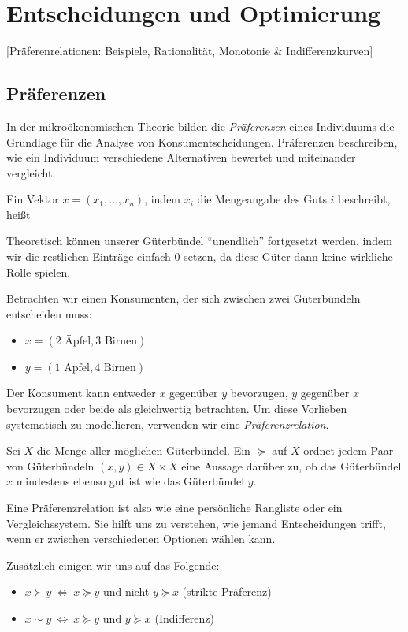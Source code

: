 \chapter{Entscheidungen und Optimierung}

[Präferenrelationen: Beispiele, Rationalität, Monotonie \& Indifferenzkurven]
\section{Präferenzen}
In der mikroökonomischen Theorie bilden die \emph{Präferenzen} eines Individuums die Grundlage für die Analyse von Konsumentscheidungen.
Präferenzen beschreiben, wie ein Individuum verschiedene Alternativen bewertet und miteinander vergleicht.

\begin{definition}[Güterbündel] 
	Ein Vektor $x = (x_1,\dotsc,x_n)$, indem $x_i$ die Mengeangabe des Guts $i$ beschreibt, heißt 
\end{definition}
\begin{remark}
	Theoretisch können unserer Güterbündel \enquote{unendlich} fortgesetzt werden, indem wir die restlichen Einträge einfach $0$ setzen, da diese Güter dann keine wirkliche Rolle spielen.
\end{remark}
\begin{example}
	Betrachten wir einen Konsumenten, der sich zwischen zwei Güterbündeln entscheiden muss:
	\begin{itemize}
		\item $x = (2 \text{ Äpfel}, 3 \text{ Birnen})$
		\item $y = (1 \text{ Apfel}, 4 \text{ Birnen})$
	\end{itemize}
	Der Konsument kann entweder $x$ gegenüber $y$ bevorzugen, $y$ gegenüber $x$ bevorzugen oder beide als gleichwertig betrachten. Um diese Vorlieben systematisch zu modellieren, verwenden wir eine \textit{Präferenzrelation}.
\end{example}

\begin{definition}[Präferenzrelation]
	Sei $X$ die Menge aller möglichen Güterbündel.
	Ein  $\succeq$  auf $X$ ordnet jedem Paar von Güterbündeln $(x, y) \in X \times X$ eine Aussage darüber zu, ob das Güterbündel $x$ mindestens ebenso gut ist wie das Güterbündel $y$.
\end{definition}
Eine Präferenzrelation ist also wie eine persönliche Rangliste oder ein Vergleichssystem. Sie hilft uns zu verstehen, wie jemand Entscheidungen trifft, wenn er zwischen verschiedenen Optionen wählen kann.
\begin{notation}
	Zusätzlich einigen wir uns auf das Folgende:
	\begin{itemize}
		\item $x \succ y \ \Leftrightarrow\  x \succeq y$ und nicht $y \succeq x$ (strikte Präferenz) 
		\item $x \sim y \ \Leftrightarrow\  x \succeq y$ und $y \succeq x$ (Indifferenz) 
	\end{itemize}
\end{notation}

